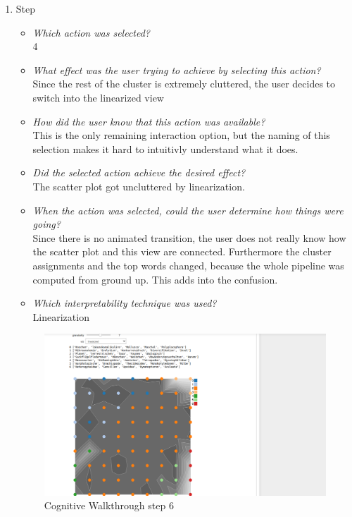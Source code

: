 {\begin{enumerate}
		\item Step
		\begin{itemize}
			\item \textit{Which action was selected?} \\
			4
			\item \textit{What effect was the user trying to achieve by selecting this action?} \\
			Since the rest of the cluster is extremely cluttered, the user decides to switch into the linearized view 
			\item \textit{How did the user know that this action was available?} \\
			This is the only remaining interaction option, but the naming of this selection makes it hard to intuitivly understand what it does. 
			\item \textit{Did the selected action achieve the desired effect?} \\
			The scatter plot got uncluttered by linearization. 
			\item \textit{When the action was selected, could the user determine how things were going?} \\
			Since there is no animated transition, the user does not really know how the scatter plot and this view are connected. Furthermore the cluster assignments and the top words changed, because the whole pipeline was computed from ground up. This adds into the confusion.
			\item \textit{Which interpretability technique was used?}\\
			Linearization
		\end{itemize}
		\begin{figure}[H]
			\centering
			\includegraphics[width=400px]{../chapters/validation/pics/5_c}
			\caption{\label{pic:step6} Cognitive Walkthrough step 6}
		\end{figure} \newpage
		

\end{enumerate}}
